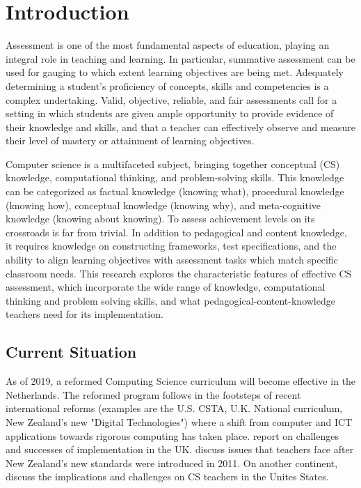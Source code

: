\section{Introduction}\label{sec:intro}
Assessment is one of the most fundamental aspects of education, playing an integral role in teaching and learning. In particular, summative assessment can be used for gauging to which extent learning objectives are being met. Adequately determining a student's proficiency of concepts, skills and competencies is a complex undertaking. Valid, objective, reliable, and fair assessments call for a setting in which students are given ample opportunity to provide evidence of their knowledge and skills, and that a teacher can effectively observe and measure their level of mastery or attainment of learning objectives.

Computer science is a multifaceted subject, bringing together conceptual (CS) knowledge, computational thinking, and problem-solving skills. This knowledge can be categorized as factual knowledge (knowing what), procedural knowledge (knowing how), conceptual knowledge (knowing why), and meta-cognitive knowledge (knowing about knowing)\cite{streun2001kennis}. To assess achievement levels on its crossroads is far from trivial. In addition to pedagogical and content knowledge, it requires knowledge on constructing frameworks, test specifications, and the ability to align learning objectives with assessment tasks which match specific classroom needs. This research explores the characteristic features of effective CS assessment, which incorporate the wide range of knowledge, computational thinking and problem solving skills, and what pedagogical-content-knowledge teachers need for its implementation.




\subsection{Current Situation}


As of 2019, a reformed Computing Science curriculum will become effective in the Netherlands. The reformed program follows in the footsteps of recent international reforms (examples are the U.S. CSTA, U.K. National curriculum, New Zealand's new "Digital Technologies") where a shift from computer and ICT applications towards rigorous computing has taken place.  report on challenges and successes of implementation in the UK.  discuss issues that teachers face after New Zealand's new standards were introduced in 2011. On another continent,  discuss the implications and challenges on CS teachers in the Unites States.

